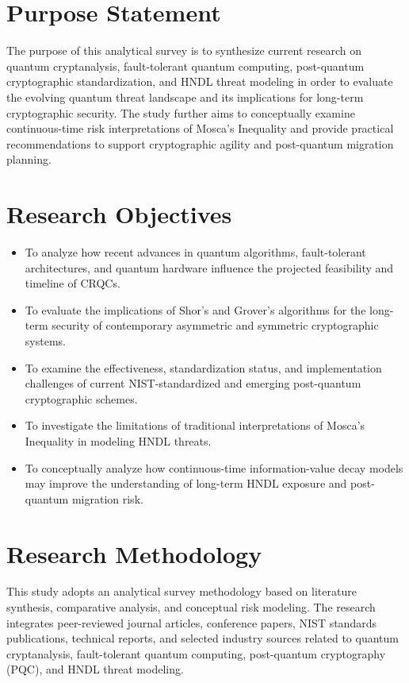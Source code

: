 \documentclass[11pt,a4paper]{article}
\begin{document}
\section{Purpose Statement}
The purpose of this analytical survey is to synthesize current research on quantum cryptanalysis, fault-tolerant quantum computing, post-quantum cryptographic standardization, and HNDL threat modeling in order to evaluate the evolving quantum threat landscape and its implications for long-term cryptographic security. The study further aims to conceptually examine continuous-time risk interpretations of Mosca’s Inequality and provide practical recommendations to support cryptographic agility and post-quantum migration planning.
\section{Research Objectives}
\begin{itemize}[leftmargin=*]

  \item To analyze how recent advances in quantum algorithms, fault-tolerant architectures, and quantum hardware influence the projected feasibility and timeline of CRQCs.
  \item To evaluate the implications of Shor’s and Grover’s algorithms for the long-term security of contemporary asymmetric and symmetric cryptographic systems.
  \item To examine the effectiveness, standardization status, and implementation challenges of current NIST-standardized and emerging post-quantum cryptographic schemes.
  \item To investigate the limitations of traditional interpretations of Mosca’s Inequality in modeling HNDL threats.
  \item To conceptually analyze how continuous-time information-value decay models may improve the understanding of long-term HNDL exposure and post-quantum migration risk.

\end{itemize}
\section{Research Methodology}
This study adopts an analytical survey methodology based on literature synthesis, comparative analysis, and conceptual risk modeling. The research integrates peer-reviewed journal articles, conference papers, NIST standards publications, technical reports, and selected industry sources related to quantum cryptanalysis, fault-tolerant quantum computing, post-quantum cryptography (PQC), and HNDL threat modeling.
\end{document}
